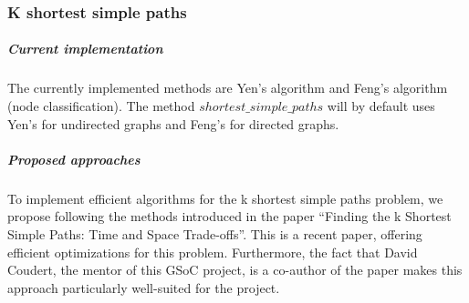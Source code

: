 \subsubsection{K shortest simple paths}

\subparagraph{Current implementation}
The currently implemented methods are Yen's algorithm\cite{yen1971} and Feng's
algorithm (node classification)\cite{feng2014}. The method
$shortest\_simple\_paths$ will by default uses Yen's for undirected graphs and
Feng's for directed graphs.

\subparagraph{Proposed approaches}
To implement efficient algorithms for the k shortest simple paths problem, we
propose following the methods introduced in the paper “Finding the k Shortest
Simple Paths: Time and Space Trade-offs”\cite{kSSP2023}. This is a recent
paper, offering efficient optimizations for this problem. Furthermore, the fact
that David Coudert, the mentor of this GSoC project, is a co-author of the
paper makes this approach particularly well-suited for the project.

